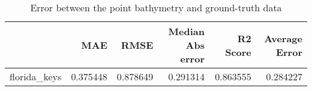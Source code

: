 \begin{table}[h!]
\caption{Error between the point bathymetry and ground-truth data}
\label{tab:florida_keys_lidar_error}
\begin{tabular}{lrrrrr}
\toprule
 & MAE & RMSE & Median Abs error & R2 Score & Average Error \\
\midrule
florida\_keys & 0.375448 & 0.878649 & 0.291314 & 0.863555 & 0.284227 \\
\bottomrule
\end{tabular}
\end{table}
